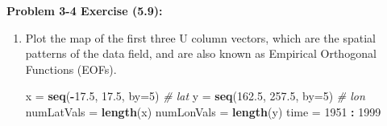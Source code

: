 \documentclass[11pt]{article}
\newcommand{\skipline}{\vspace{\baselineskip}}
\newenvironment{problem}[1]{\textbf{Problem #1:}}{\newpage}
\newenvironment{Shaded}{\begin{snugshade}}{\end{snugshade}}
\newcommand{\CommentTok}[1]{\textcolor[rgb]{0.56,0.35,0.01}{\textit{#1}}}
\newcommand{\DataTypeTok}[1]{\textcolor[rgb]{0.13,0.29,0.53}{#1}}
\newcommand{\DecValTok}[1]{\textcolor[rgb]{0.00,0.00,0.81}{#1}}
\newcommand{\FloatTok}[1]{\textcolor[rgb]{0.00,0.00,0.81}{#1}}
\newcommand{\KeywordTok}[1]{\textcolor[rgb]{0.13,0.29,0.53}{\textbf{#1}}}
\newcommand{\NormalTok}[1]{#1}
\newcommand{\OperatorTok}[1]{\textcolor[rgb]{0.81,0.36,0.00}{\textbf{#1}}}
\newcommand{\StringTok}[1]{\textcolor[rgb]{0.31,0.60,0.02}{#1}}
\begin{document}
\begin{problem}{3-4 Exercise (5.9)}
\begin{enumerate}[label = (\alph*)]
\begin{Shaded}
\end{Shaded}

\begin{verbatim}
##  [1] 105.4814490  22.2559501   5.4832410   3.3866133   2.8810880   
##  [6]   2.1684325   1.4404727   1.2810827   0.9563928   0.7468040
\end{verbatim}
			\skipline
			\item  Plot the map of the first three U column vectors, which are the spatial patterns of the
			data field, and are also known as Empirical Orthogonal Functions (EOFs).
\begin{Shaded}
\begin{Highlighting}[]
\NormalTok{x =}\StringTok{ }\KeywordTok{seq}\NormalTok{(}\OperatorTok{-}\FloatTok{17.5}\NormalTok{, }\FloatTok{17.5}\NormalTok{, }\DataTypeTok{by=}\DecValTok{5}\NormalTok{)  }\CommentTok{# lat}
\NormalTok{y =}\StringTok{ }\KeywordTok{seq}\NormalTok{(}\FloatTok{162.5}\NormalTok{, }\FloatTok{257.5}\NormalTok{, }\DataTypeTok{by=}\DecValTok{5}\NormalTok{) }\CommentTok{# lon}
\NormalTok{numLatVals =}\StringTok{ }\KeywordTok{length}\NormalTok{(x)}
\NormalTok{numLonVals =}\StringTok{ }\KeywordTok{length}\NormalTok{(y)}
\NormalTok{time =}\StringTok{ }\DecValTok{1951} \OperatorTok{:}\StringTok{ }\DecValTok{1999}


\end{Highlighting}
\end{Shaded}
\end{enumerate}
\end{problem}
\end{document}

